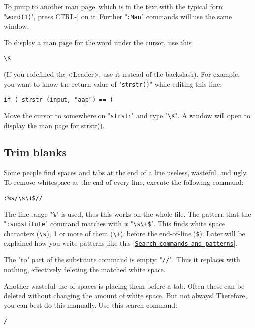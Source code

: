 To jump to another man page, which is in the text with the typical form "\verb!word(1)!", press CTRL-] on it.
Further "\verb!:Man!" commands will use the same window.

To display a man page for the word under the cursor, use this:

\begin{Verbatim}[samepage=true]
 \K
\end{Verbatim}

(If you redefined the <Leader>, use it instead of the backslash).
For example, you want to know the return value of "\verb!strstr()!" while editing
this line:

\begin{Verbatim}[samepage=true]
    if ( strstr (input, "aap") == ) 
\end{Verbatim}

Move the cursor to somewhere on "\verb!strstr!" and type "\verb!\K!".
A window will open to display the man page for strstr().
\subsection{Trim blanks}
Some people find spaces and tabs at the end of a line useless, wasteful, and ugly.
To remove whitespace at the end of every line, execute the following command:

\begin{Verbatim}[samepage=true]
 :%s/\s\+$//
\end{Verbatim}

The line range "\verb!%!" is used, thus this works on the whole file.
The pattern that the "\verb!:substitute!" command matches with is "\verb!\s\+$!".
This finds white space characters (\verb!\s!), 1 or more of them (\verb!\+!), before the end-of-line (\verb!$!).
Later will be explained how you write patterns like this |\hyperref[Search commands and patterns]{\texttt{Search commands and patterns}}|.

The "to" part of the substitute command is empty: "\verb!//!".
Thus it replaces with nothing, effectively deleting the matched white space.

Another wasteful use of spaces is placing them before a tab.
Often these can be deleted without changing the amount of white space.
But not always!  Therefore, you can best do this manually.
Use this search command:

\begin{Verbatim}[samepage=true]
 /   
\end{Verbatim}

